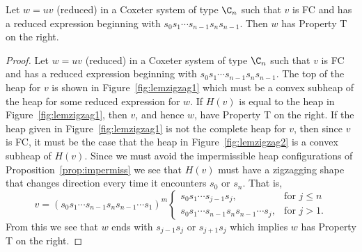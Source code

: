 \begin{lemma}\label{lem:zigzag}
Let $w=uv$ (reduced) in a Coxeter system of type $\C_n$ such that $v$ is FC and has a reduced expression beginning with $s_0s_1\cdots s_{n-1}s_ns_{n-1}$. Then $w$ has Property T on the right.
\begin{proof}
	Let $w=uv$ (reduced) in a Coxeter system of type $\C_n$ such that $v$ is FC and has a reduced expression beginning with $s_0s_1 \cdots s_{n-1}s_ns_{n-1}$. The top of the heap for $v$ is shown in Figure~\ref{fig:lemzigzag1} which must be a convex subheap of the heap for some reduced expression for $w$. If $H(v)$ is equal to the heap in Figure~\ref{fig:lemzigzag1}, then $v$, and hence $w$, have Property T on the right. If the heap given in Figure~\ref{fig:lemzigzag1} is not the complete heap for $v$, then since $v$ is FC, it must be the case that the heap in Figure~\ref{fig:lemzigzag2} is a convex subheap of $H(v)$. Since we must avoid the impermissible heap configurations of Proposition~\ref{prop:impermiss} we see that $H(v)$ must have a zigzagging shape that changes direction every time it encounters $s_0$ or $s_n$. That is, 
	\[
		v=(s_0s_1 \cdots s_{n-1}s_ns_{n-1} \cdots s_1)^m 
		\begin{cases}
 			s_0s_1 \cdots s_{j-1}s_j, & \text{for } j \leq n\\
 			s_0s_1 \cdots s_{n-1}s_ns_{n-1} \cdots s_j, & \text{for } j> 1.
		\end{cases}
	\]  
	From this we see that $w$ ends with $s_{j-1}s_j$ or $s_{j+1}s_j$ which implies $w$ has Property T on the right.
\end{proof}
\end{lemma}

